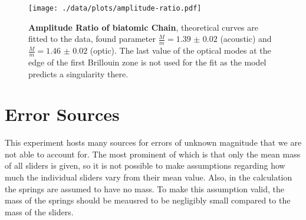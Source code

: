 \begin{figure}
	\centering
	\texttt{[image: ./data/plots/amplitude-ratio.pdf]}
	\caption[Amplitude Ratio of biatomic Chain]{\textbf{Amplitude Ratio of biatomic Chain}, theoretical curves are fitted to the data, found parameter $\frac{M}{m} = \num{1.39(2)}$ (acoustic) and $\frac{M}{m} = \num{1.46(2)}$ (optic). The last value of the optical modes at the edge of the first Brillouin zone is not used for the fit as the model predicts a singularity there.}
	\label{fig:amplitude-ratio}
\end{figure}

\section{Error Sources}
This experiment hosts many sources for errors of unknown magnitude that we are not able to account for.
The most prominent of which is that only the mean mass of all sliders is given, so it is not possible to make assumptions regarding how much the individual sliders vary from their mean value.
Also, in the calculation the springs are assumed to have no mass.
To make this assumption valid, the mass of the springs should be meausred to be negligibly small compared to the mass of the sliders.

